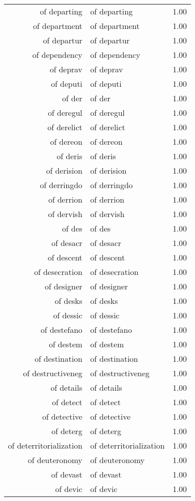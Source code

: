 \begin{table}[ht]
\begin{tabular}{rlr}
  of departing & of departing & 1.00 \\ 
  of department & of department & 1.00 \\ 
  of departur & of departur & 1.00 \\ 
  of dependency & of dependency & 1.00 \\ 
  of deprav & of deprav & 1.00 \\ 
  of deputi & of deputi & 1.00 \\ 
  of der & of der & 1.00 \\ 
  of deregul & of deregul & 1.00 \\ 
  of derelict & of derelict & 1.00 \\ 
  of dereon & of dereon & 1.00 \\ 
  of deris & of deris & 1.00 \\ 
  of derision & of derision & 1.00 \\ 
  of derringdo & of derringdo & 1.00 \\ 
  of derrion & of derrion & 1.00 \\ 
  of dervish & of dervish & 1.00 \\ 
  of des & of des & 1.00 \\ 
  of desacr & of desacr & 1.00 \\ 
  of descent & of descent & 1.00 \\ 
  of desecration & of desecration & 1.00 \\ 
  of designer & of designer & 1.00 \\ 
  of desks & of desks & 1.00 \\ 
  of dessic & of dessic & 1.00 \\ 
  of destefano & of destefano & 1.00 \\ 
  of destem & of destem & 1.00 \\ 
  of destination & of destination & 1.00 \\ 
  of destructiveneg & of destructiveneg & 1.00 \\ 
  of details & of details & 1.00 \\ 
  of detect & of detect & 1.00 \\ 
  of detective & of detective & 1.00 \\ 
  of deterg & of deterg & 1.00 \\ 
  of deterritorialization & of deterritorialization & 1.00 \\ 
  of deuteronomy & of deuteronomy & 1.00 \\ 
  of devast & of devast & 1.00 \\ 
  of devic & of devic & 1.00 \\ 

\end{tabular}
\end{table}
